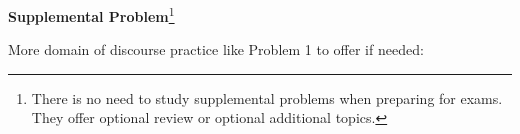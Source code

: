 \documentclass[handout]{mcs}
\begin{document}






\begin{center}
\textbf{Supplemental Problem}\footnote{There is no need to study
  supplemental problems when preparing for exams.  They offer optional
  review or optional additional topics.}
\end{center}


\begin{staffnotes}
More domain of discourse practice like Problem 1 to offer if needed:

\end{staffnotes}







\end{document}
